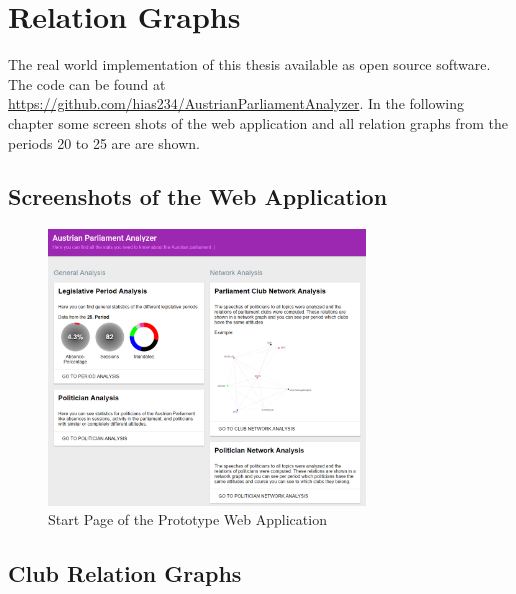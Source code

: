 

\chapter{Relation Graphs}
\label{appendix:Relation Graphs}

\newcommand{\versionEL}{2.2}
\newcommand{\versionJava}{1.7.0\_45-b18}
\newcommand{\versionJSF}{2.1.7}
\newcommand{\versionJSP}{2.2}
\newcommand{\versionMaven}{3.1.1}
\newcommand{\versionObjectAid}{1.1.6}
\newcommand{\versionPrimeFaces}{3.3.1}
\newcommand{\versionServlet}{3.0}
\newcommand{\versionSigmaJS}{0.1}
\newcommand{\versionSpring}{3.1.1}
\newcommand{\versionSpringWebflow}{2.3.1}
\newcommand{\versionTomcat}{7.0.29}
\newcommand{\versionZooKeeper}{3.4.5}

The real world implementation of this thesis available as open source software. The code can be found at \url{https://github.com/hias234/AustrianParliamentAnalyzer}. In the following chapter some screen shots of the web application and all relation graphs from the periods 20 to 25 are are shown.

\section{Screenshots of the Web Application}

\begin{figure}[h]
	\center
	\includegraphics[width=0.75\textwidth]{imgs/result_start_page}
	\caption{Start Page of the Prototype Web Application}
	\label{fig:start_page}
\end{figure}

\section{Club Relation Graphs}

